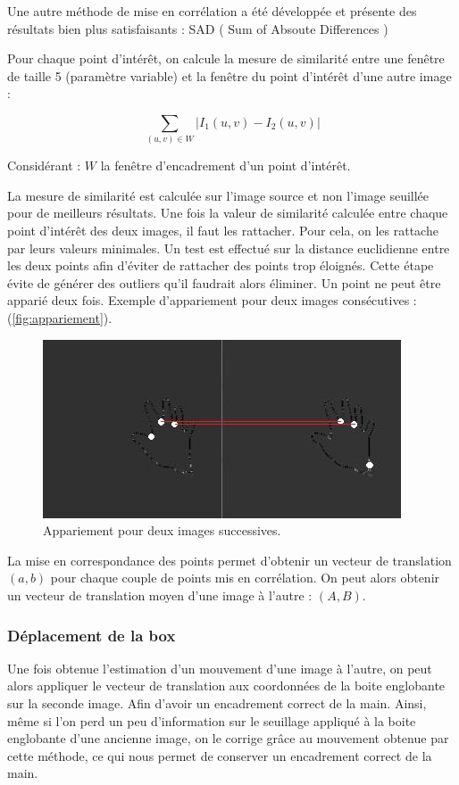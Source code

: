 	Une autre méthode de mise en corrélation a été développée et présente des résultats bien plus satisfaisants : SAD ( Sum of Absoute Differences )

	Pour chaque point d’intérêt, on calcule la mesure de similarité entre une fenêtre de taille 5 (paramètre variable) et la fenêtre du point d’intérêt d’une autre image : 

\[
\sum_{(u,v) \in W} |I_1(u,v) - I_2(u,v)|
\]

Considérant : $W$ la fenêtre d’encadrement d’un point d’intérêt.

La mesure de similarité est calculée sur l’image source et non l’image seuillée pour de meilleurs résultats. Une fois la valeur de similarité calculée entre chaque point d’intérêt des deux images, il faut les rattacher. Pour cela, on les rattache par leurs valeurs minimales. Un test est effectué sur la distance euclidienne entre les deux points afin d’éviter de rattacher des points trop éloignés. Cette étape évite de générer des outliers qu’il faudrait alors éliminer. Un point ne peut être apparié deux fois.
Exemple d’appariement pour deux images consécutives : (\autoref{fig:appariement}).

\begin{figure}[htb!]
\centerline{\includegraphics{appariement.jpg}}
\caption{Appariement pour deux images successives.}
\label{fig:appariement}
\end{figure}

La mise en correspondance des points permet d’obtenir un vecteur de translation $(a,b)$ pour chaque couple de points mis en corrélation. On peut alors obtenir un vecteur de translation moyen d’une image à l’autre : $(A,B)$.

\subsubsection{Déplacement de la box}

Une fois obtenue l’estimation d’un mouvement d’une image à l’autre, on peut alors appliquer le vecteur de translation aux coordonnées de la boite englobante sur la seconde image. Afin d’avoir un encadrement correct de la main. Ainsi, même si l’on perd un peu d’information sur le seuillage appliqué à la boite englobante d’une ancienne image, on le corrige grâce au mouvement obtenue par cette méthode, ce qui nous permet de conserver un encadrement correct de la main.

